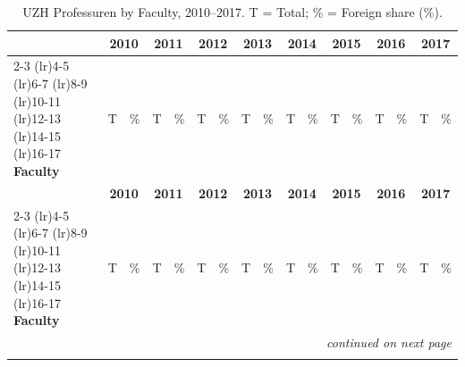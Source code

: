 \documentclass{article}
\begin{document}
\small
\setlength{\tabcolsep}{3pt}
\renewcommand{\arraystretch}{1.05}

\begin{longtable}{@{}l rr rr rr rr rr rr rr rr@{}}
  \caption{UZH Professuren by Faculty, 2010--2017. T = Total; \% = Foreign share (\%).}
  \label{tab:uzh_professors_part1} \\
  \toprule
   & \multicolumn{2}{c}{\textbf{2010}} & \multicolumn{2}{c}{\textbf{2011}} & \multicolumn{2}{c}{\textbf{2012}} & \multicolumn{2}{c}{\textbf{2013}} & \multicolumn{2}{c}{\textbf{2014}} & \multicolumn{2}{c}{\textbf{2015}} & \multicolumn{2}{c}{\textbf{2016}} & \multicolumn{2}{c}{\textbf{2017}} \\
  \cmidrule(lr){2-3} \cmidrule(lr){4-5} \cmidrule(lr){6-7} \cmidrule(lr){8-9} \cmidrule(lr){10-11} \cmidrule(lr){12-13} \cmidrule(lr){14-15} \cmidrule(lr){16-17}
  \textbf{Faculty}  & T & \% & T & \% & T & \% & T & \% & T & \% & T & \% & T & \% & T & \% \\
  \midrule
  \endfirsthead

  \toprule
   & \multicolumn{2}{c}{\textbf{2010}} & \multicolumn{2}{c}{\textbf{2011}} & \multicolumn{2}{c}{\textbf{2012}} & \multicolumn{2}{c}{\textbf{2013}} & \multicolumn{2}{c}{\textbf{2014}} & \multicolumn{2}{c}{\textbf{2015}} & \multicolumn{2}{c}{\textbf{2016}} & \multicolumn{2}{c}{\textbf{2017}} \\
  \cmidrule(lr){2-3} \cmidrule(lr){4-5} \cmidrule(lr){6-7} \cmidrule(lr){8-9} \cmidrule(lr){10-11} \cmidrule(lr){12-13} \cmidrule(lr){14-15} \cmidrule(lr){16-17}
  \textbf{Faculty}  & T & \% & T & \% & T & \% & T & \% & T & \% & T & \% & T & \% & T & \% \\
  \midrule
  \endhead

  \midrule
  \multicolumn{17}{r}{\textit{continued on next page}} \\
  \endfoot

  \bottomrule
  \endlastfoot


\end{longtable}
\end{document}
